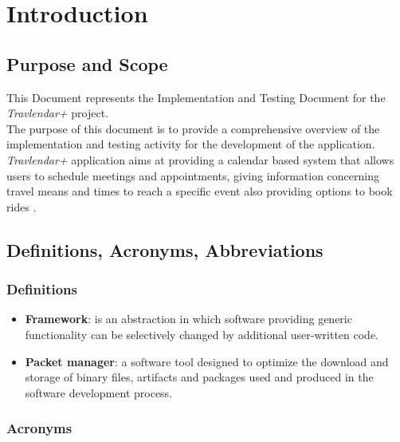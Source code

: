\section{Introduction}
\subsection{Purpose and Scope}
This Document represents the Implementation and Testing Document for the \textit{Travlendar+} project.\\
The purpose of this document is to provide a comprehensive overview of the implementation and testing activity for the development of the application.\\
\textit{Travlendar+} application aims at providing a calendar based system that allows users to schedule meetings and appointments, giving information concerning travel means and times to reach a specific event also providing options to book rides .

\subsection{Definitions, Acronyms, Abbreviations}

\subsubsection{Definitions}
\begin{itemize}
	\item \textbf{Framework}: is an abstraction in which software providing generic functionality can be selectively changed by additional user-written code.
	\item \textbf{Packet manager}: a software tool designed to optimize the download and storage of binary files, artifacts and packages used and produced in the software development process.
\end{itemize}

\subsubsection{Acronyms}

